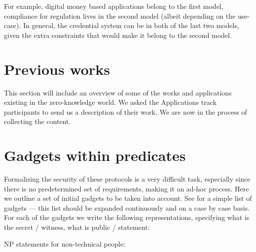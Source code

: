 For example, digital money based applications belong to the first model, compliance for regulation lives in the second model (albeit depending on the use-case). In general, the credential system can be in both of the last two models, given the extra constraints that would make it belong to the second model.


\section{Previous works}
\label{apps:previous-works}

This section will include an overview of some of the works and applications existing in the zero-knowledge world. 
We asked the Applications track participants to send us a description of their work.
We are now in the process of collecting the content.


\section{Gadgets within predicates}
\label{apps:gadgets-within-predicates}


Formalizing the security of these protocols is a very difficult task, especially since there is no predetermined set of requirements, making it an ad-hoc process. 
Here we outline a set of initial gadgets to be taken into account.%
See  for a simple list of gadgets --- this list should be expanded continuously and on a case by case basis.
	For each of the gadgets %
we write the following representations, specifying what is the secret / witness, what is public / statement:

NP statements for non-technical people:

